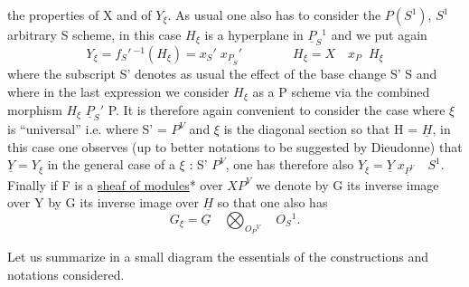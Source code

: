 
the properties of X and of $Y_\xi$.  As usual one also has to consider
the $P(S^1)$, $S^1$ arbitrary S scheme, in this case $H_\xi$ is a hyperplane
in $\underline{P}_S{}^1$ and we put again
\[ Y_\xi = f_S{}'\,{}^{-1}(H_\xi) = x_S{}'\; x_{\underline{P}_{S}}{}' \qquad\qquad H_\xi = X \quad x_P \;\; H_\xi \]
where the subscript S' denotes as usual the effect of the base
change S' \qquad\qquad S and where in the last expression we consider
$H_\xi$ as a P scheme via the combined morphism $H_\xi$ \qquad $\underline{P}_S{}'$ \quad P.  It is
therefore again convenient to consider the case where $\xi$ is
``universal'' i.e. where S' = $P^V$ and $\xi$ is the diagonal section so
that H = $\underline{H}$, in this case one observes (up to better notations to
be suggested by Dieudonne) that $\underline{Y} = Y_\xi$ in the general case of a $\xi$
: S' \qquad\qquad $P^V$, one has therefore also $Y_\xi = \underline{Y}\; x_{\underline{P}^{V}} \quad S^1$.  Finally if
F is a \uline{sheaf of modules}* over $XP^V$ we denote by G its inverse image
over Y by G its inverse image over $\underline{H}$ so that one also has
\[ G_\xi = \underline{G} \quad \bigotimes_{O_{\underline{P}}{}^V} \quad O_S{}^1. \]

Let us summarize in a small diagram the essentials of the
constructions and notations considered.



